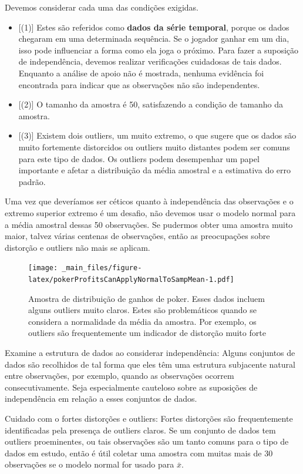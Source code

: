 \documentclass[
]{book}
\theoremstyle{definition}
\theoremstyle{definition}
\theoremstyle{definition}
\theoremstyle{definition}
\theoremstyle{remark}
\begin{document}
Devemos considerar cada uma das condições exigidas.

\begin{itemize}
\item
  {[}(1){]} Estes são referidos como \textbf{dados da série temporal}, porque os dados chegaram em uma determinada sequência. Se o jogador ganhar em um dia, isso pode influenciar a forma como ela joga o próximo. Para fazer a suposição de independência, devemos realizar verificações cuidadosas de tais dados. Enquanto a análise de apoio não é mostrada, nenhuma evidência foi encontrada para indicar que as observações não são independentes.
\item
  {[}(2){]} O tamanho da amostra é 50, satisfazendo a condição de tamanho da amostra.
\item
  {[}(3){]} Existem dois outliers, um muito extremo, o que sugere que os dados são muito fortemente distorcidos ou outliers muito distantes podem ser comuns para este tipo de dados. Os outliers podem desempenhar um papel importante e afetar a distribuição da média amostral e a estimativa do erro padrão.
\end{itemize}

Uma vez que deveríamos ser céticos quanto à independência das observações e o extremo superior extremo é um desafio, não devemos usar o modelo normal para a média amostral dessas 50 observações. Se pudermos obter uma amostra muito maior, talvez várias centenas de observações, então as preocupações sobre distorção e outliers não mais se aplicam.

\begin{figure}
\centering
\texttt{[image: \_main\_files/figure-latex/pokerProfitsCanApplyNormalToSampMean-1.pdf]}
\caption{\label{fig:pokerProfitsCanApplyNormalToSampMean}Amostra de distribuição de ganhos de poker. Esses dados incluem alguns outliers muito claros. Estes são problemáticos quando se considera a normalidade da média da amostra. Por exemplo, os outliers são frequentemente um indicador de distorção muito forte}
\end{figure}

Examine a estrutura de dados ao considerar independência: Alguns conjuntos de dados são recolhidos de tal forma que eles têm uma estrutura subjacente natural entre observações, por exemplo, quando as observações ocorrem consecutivamente. Seja especialmente cauteloso sobre as suposições de independência em relação a esses conjuntos de dados.

Cuidado com o fortes distorções e outliers: Fortes distorções são frequentemente identificadas pela presença de outliers claros. Se um conjunto de dados tem outliers proeminentes, ou tais observações são um tanto comuns para o tipo de dados em estudo, então é útil coletar uma amostra com muitas mais de 30 observações se o modelo normal for usado para \(\bar{x}\).
\end{document}

